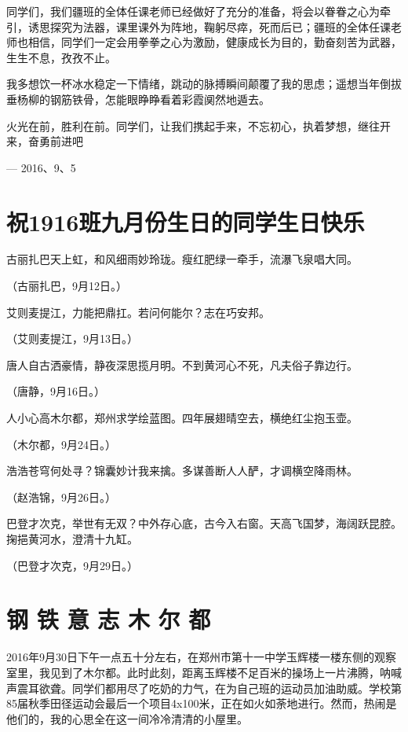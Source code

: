 \documentclass[openany]{ctexbook}
\begin{document}
同学们，我们疆班的全体任课老师已经做好了充分的准备，将会以眷眷之心为牵引，诱思探究为法器，课里课外为阵地，鞠躬尽瘁，死而后已；疆班的全体任课老师也相信，同学们一定会用拳拳之心为激励，健康成长为目的，勤奋刻苦为武器，生生不息，孜孜不止。

我多想饮一杯冰水稳定一下情绪，跳动的脉搏瞬间颠覆了我的思虑；遥想当年倒拔垂杨柳的钢筋铁骨，怎能眼睁睁看着彩霞阒然地遁去。

火光在前，胜利在前。同学们，让我们携起手来，不忘初心，执着梦想，继往开来，奋勇前进吧

--- 2016、9、5

\chapter*{祝1916班九月份生日的同学生日快乐}\label{birthday9}

古丽扎巴天上虹，和风细雨妙玲珑。瘦红肥绿一牵手，流瀑飞泉唱大同。

（古丽扎巴，9月12日。）

艾则麦提江，力能把鼎扛。若问何能尔？志在巧安邦。

（艾则麦提江，9月13日。）

唐人自古洒豪情，静夜深思揽月明。不到黄河心不死，凡夫俗子靠边行。

（唐静，9月16日。）

人小心高木尔都，郑州求学绘蓝图。四年展翅晴空去，横绝红尘抱玉壶。

（木尔都，9月24日。）

浩浩苍穹何处寻？锦囊妙计我来擒。多谋善断人人酽，才调横空降雨林。

（赵浩锦，9月26日。）

巴登才次克，举世有无双？中外存心底，古今入右窗。天高飞国梦，海阔跃昆腔。掬挹黄河水，澄清十九缸。

（巴登才次克，9月29日。）

\chapter*{钢 铁 意 志 木 尔 都}\label{muerdu}

2016年9月30日下午一点五十分左右，在郑州市第十一中学玉辉楼一楼东侧的观察室里，我见到了木尔都。此时此刻，距离玉辉楼不足百米的操场上一片沸腾，呐喊声震耳欲聋。同学们都用尽了吃奶的力气，在为自己班的运动员加油助威。学校第85届秋季田径运动会最后一个项目4x100米，正在如火如荼地进行。然而，热闹是他们的，我的心思全在这一间冷冷清清的小屋里。
\end{document}
